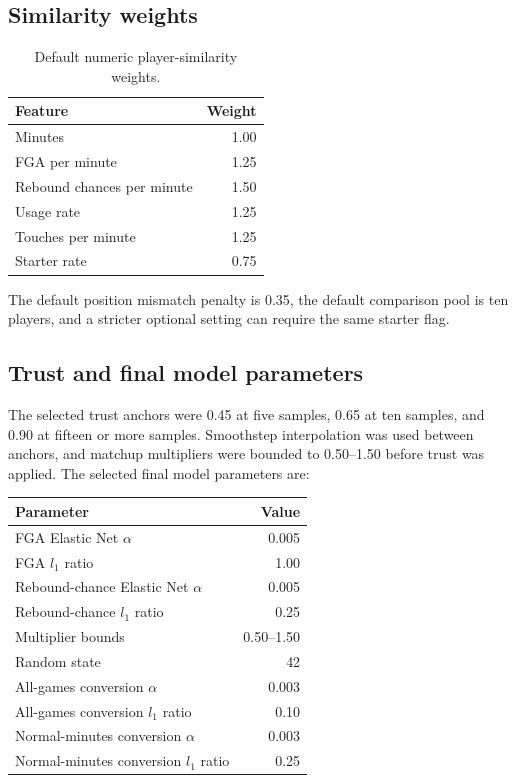 \documentclass[11pt]{article}
\begin{document}
\subsection{Similarity weights}

\begin{table}[H]
\centering
\caption{Default numeric player-similarity weights.}
\begin{tabular}{lr}
\toprule
Feature & Weight \\
\midrule
Minutes & 1.00 \\
FGA per minute & 1.25 \\
Rebound chances per minute & 1.50 \\
Usage rate & 1.25 \\
Touches per minute & 1.25 \\
Starter rate & 0.75 \\
\bottomrule
\end{tabular}
\end{table}

The default position mismatch penalty is 0.35, the default comparison pool is
ten players, and a stricter optional setting can require the same starter flag.

\subsection{Trust and final model parameters}
The selected trust anchors were 0.45 at five samples, 0.65 at ten samples,
and 0.90 at fifteen or more samples. Smoothstep interpolation was used between
anchors, and matchup multipliers were bounded to 0.50--1.50 before trust was
applied. The selected final model parameters are:

\begin{table}[H]
\centering
\begin{tabular}{lr}
\toprule
Parameter & Value \\
\midrule
FGA Elastic Net $\alpha$ & 0.005 \\
FGA $l_1$ ratio & 1.00 \\
Rebound-chance Elastic Net $\alpha$ & 0.005 \\
Rebound-chance $l_1$ ratio & 0.25 \\
Multiplier bounds & 0.50--1.50 \\
Random state & 42 \\
All-games conversion $\alpha$ & 0.003 \\
All-games conversion $l_1$ ratio & 0.10 \\
Normal-minutes conversion $\alpha$ & 0.003 \\
Normal-minutes conversion $l_1$ ratio & 0.25 \\
\bottomrule
\end{tabular}
\end{table}
\end{document}
